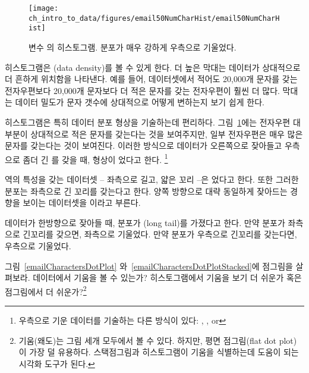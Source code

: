 \begin{figure}[bth]
   \centering
   \texttt{[image: ch\_intro\_to\_data/figures/email50NumCharHist/email50NumCharHist]}
   \caption{
   변수 의 히스토그램. 분포가 매우 강하게 우측으로 기울었다.}
   \label{email50NumCharHist}
\end{figure}

히스토그램은 (data density)를 볼 수 있게 한다.
더 높은 막대는 데이터가 상대적으로 더 흔하게 위치함을 나타낸다.
예를 들어, 데이터셋에서 적어도 20,000개 문자를 갖는 전자우편보다 20,000개 문자보다 더 적은 문자를 갖는 전자우편이 훨씬 더 많다.
막대는 데이터 밀도가 문자 갯수에 상대적으로 어떻게 변하는지 보기 쉽게 한다.

히스토그램은 특히 데이터 분포 형상을 기술하는데 편리하다.\label{shapeFirstDiscussed}
그림~\ref{email50NumCharHist}에는 전자우편 대부분이 상대적으로 적은 문자를 갖는다는 것을 보여주지만,
일부 전자우편은 매우 많은 문자를 갖는다는 것이 보여진다.
이러한 방식으로 데이터가 오른쪽으로 잦아들고 우측으로 좀더 긴 를 갖을 때, 형상이 었다고 한다.
\footnote{우측으로 기운 데이터를 기술하는 다른 방식이 있다: , , or }

역의 특성을 갖는 데이터셋 -- 좌측으로 길고, 얇은 꼬리 --은 었다고 한다.
또한 그러한 분포는 좌측으로 긴 꼬리를 갖는다고 한다.
양쪽 방향으로 대략 동일하게 잦아드는 경향을 보이는 데이터셋을 이라고 부른다.

\begin{termBox}{%
데이터가 한방향으로 잦아들 때, 분포가 (long tail)를 가졌다고 한다.
만약 분포가 좌측으로 긴꼬리를 갖으면, 좌측으로 기울었다. 만약 분포가 우측으로 긴꼬리를 갖는다면, 우측으로 기울었다.}
\end{termBox}


\begin{exercise}
그림~\ref{emailCharactersDotPlot} 와~\ref{emailCharactersDotPlotStacked}에 점그림을 살펴보라.
데이터에서 기움을 볼 수 있는가? 히스토그램에서 기움을 보기 더 쉬운가 혹은 점그림에서 더 쉬운가?\footnote{
기움(왜도)는 그림 세개 모두에서 볼 수 있다. 하지만, 평면 점그림(flat dot plot)이 가장 덜 유용하다.
스택점그림과 히스토그램이 기움을 식별하는데 도움이 되는 시각화 도구가 된다.}
\end{exercise}

